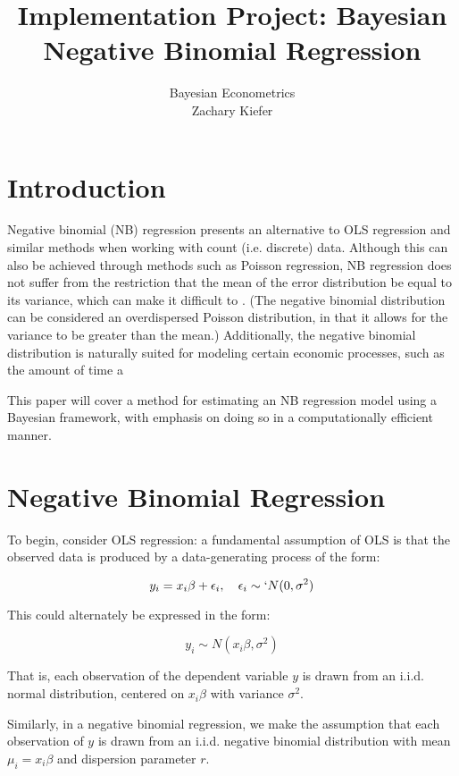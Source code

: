 \documentclass[12pt]{article}
\title{Implementation Project: Bayesian Negative Binomial Regression}
\author{Bayesian Econometrics\\Zachary Kiefer}
\begin{document}
	\maketitle
	\section{Introduction}
	Negative binomial (NB) regression presents an alternative to OLS regression and similar methods when working with count (i.e. discrete) data. Although this can also be achieved through methods such as Poisson regression, NB regression does not suffer from the restriction that the mean of the error distribution be equal to its variance, which can make it difficult to . (The negative binomial distribution can be considered an overdispersed Poisson distribution, in that it allows for the variance to be greater than the mean.) Additionally, the negative binomial distribution is naturally suited for modeling certain economic processes, such as the amount of time a
	
	This paper will cover a method for estimating an NB regression model using a Bayesian framework, with emphasis on doing so in a computationally efficient manner.
	
	\section{Negative Binomial Regression}
	To begin, consider OLS regression: a fundamental assumption of OLS is that the observed data is produced by a data-generating process of the form:
	
	\begin{equation}
	y_i = x_i \beta + \epsilon_i,~~~\epsilon_i \sim`N(0, \sigma^2)
	\end{equation}
	
	This could alternately be expressed in the form:
	
	\begin{equation}
	y_i \sim N(x_i \beta, \sigma^2)
	\end{equation}
	
	That is, each observation of the dependent variable $y$ is drawn from an i.i.d. normal distribution, centered on $x_i\beta$ with variance $\sigma^2$.
	
	Similarly, in a negative binomial regression, we make the assumption that each observation of $y$ is drawn from an i.i.d. negative binomial distribution with mean $\mu_i = x_i \beta$ and dispersion parameter $r$.
	
\end{document}
